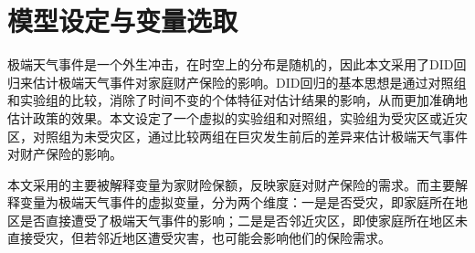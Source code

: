\section{模型设定与变量选取}

极端天气事件是一个外生冲击，在时空上的分布是随机的，因此本文采用了DID回归来估计极端天气事件对家庭财产保险的影响。DID回归的基本思想是通过对照组和实验组的比较，消除了时间不变的个体特征对估计结果的影响，从而更加准确地估计政策的效果。本文设定了一个虚拟的实验组和对照组，实验组为受灾区或近灾区，对照组为未受灾区，通过比较两组在巨灾发生前后的差异来估计极端天气事件对财产保险的影响。

本文采用的主要被解释变量为家财险保额，反映家庭对财产保险的需求。而主要解释变量为极端天气事件的虚拟变量，分为两个维度：一是是否受灾，即家庭所在地区是否直接遭受了极端天气事件的影响；二是是否邻近灾区，即使家庭所在地区未直接受灾，但若邻近地区遭受灾害，也可能会影响他们的保险需求。

